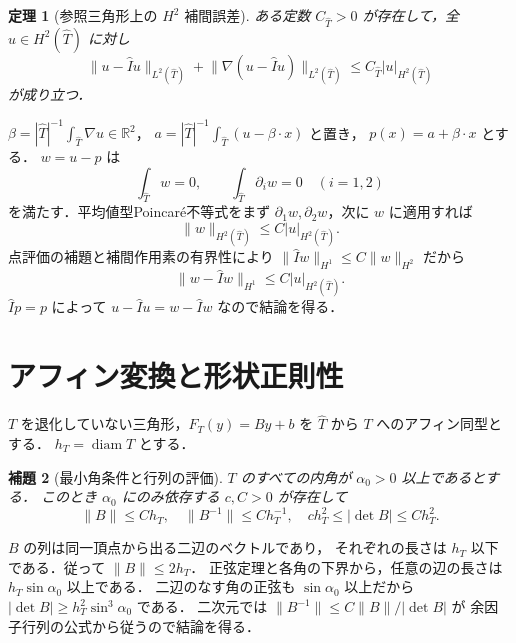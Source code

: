 \documentclass[a5paper,10pt,onecolumn]{jsarticle}
\makeatletter
\theoremstyle{mathnotetheorem}
\newtheorem{theorem}{定理}[section]
\newtheorem{lemma}[theorem]{補題}
\renewcommand{\proofname}{証明}
\renewenvironment{proof}[1][\proofname]{%
  \par\pushQED{\qed}\normalfont\topsep4\p@\@plus2\p@\relax
  \trivlist\item[\hskip\labelsep\bfseries #1]\ignorespaces
}{\popQED\endtrivlist\@endpefalse}
\newcommand{\norm}[1]{\lVert #1\rVert}
\makeatother
\begin{document}
\begin{theorem}[参照三角形上の $H^2$ 補間誤差]
ある定数 $C_{\widehat T}>0$ が存在して，全 $u\in H^2(\widehat T)$ に対し
\[
 \norm{u-\widehat Iu}_{L^2(\widehat T)}
 +\norm{\nabla(u-\widehat Iu)}_{L^2(\widehat T)}
 \le C_{\widehat T}|u|_{H^2(\widehat T)}
\]
が成り立つ．
\end{theorem}
\begin{proof}
$\beta=|\widehat T|^{-1}\int_{\widehat T}\nabla u\in\mathbb R^2$，
$a=|\widehat T|^{-1}\int_{\widehat T}(u-\beta\cdot x)$ と置き，
$p(x)=a+\beta\cdot x$ とする．
$w=u-p$ は
\[
 \int_{\widehat T}w=0,\qquad
 \int_{\widehat T}\partial_iw=0\quad(i=1,2)
\]
を満たす．平均値型Poincar\'e不等式をまず
$\partial_1w,\partial_2w$，次に $w$ に適用すれば
\[
 \norm w_{H^2(\widehat T)}\le C|u|_{H^2(\widehat T)}.
\]
点評価の補題と補間作用素の有界性により
$\norm{\widehat Iw}_{H^1}\le C\norm w_{H^2}$ だから
\[
 \norm{w-\widehat Iw}_{H^1}
 \le C|u|_{H^2(\widehat T)}.
\]
$\widehat Ip=p$ によって
$u-\widehat Iu=w-\widehat Iw$ なので結論を得る．
\end{proof}

\section{アフィン変換と形状正則性}
$T$ を退化していない三角形，$F_T(y)=By+b$ を
$\widehat T$ から $T$ へのアフィン同型とする．
$h_T=\operatorname{diam}T$ とする．

\begin{lemma}[最小角条件と行列の評価]
$T$ のすべての内角が $\alpha_0>0$ 以上であるとする．
このとき $\alpha_0$ にのみ依存する $c,C>0$ が存在して
\[
 \norm B\le Ch_T,\quad
 \norm{B^{-1}}\le C h_T^{-1},\quad
 ch_T^2\le|\det B|\le Ch_T^2.
\]
\end{lemma}
\begin{proof}
$B$ の列は同一頂点から出る二辺のベクトルであり，
それぞれの長さは $h_T$ 以下である．従って $\norm B\le2h_T$．
正弦定理と各角の下界から，任意の辺の長さは
$h_T\sin\alpha_0$ 以上である．
二辺のなす角の正弦も $\sin\alpha_0$ 以上だから
$|\det B|\ge h_T^2\sin^3\alpha_0$ である．
二次元では $\norm{B^{-1}}\le C\norm B/|\det B|$ が
余因子行列の公式から従うので結論を得る．
\end{proof}
\end{document}
